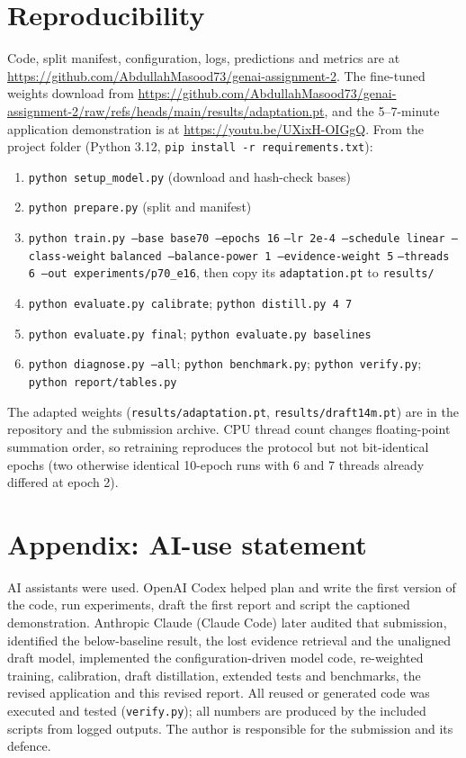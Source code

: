 \section*{Reproducibility}
Code, split manifest, configuration, logs, predictions and metrics are at \url{https://github.com/AbdullahMasood73/genai-assignment-2}. The fine-tuned weights download from \url{https://github.com/AbdullahMasood73/genai-assignment-2/raw/refs/heads/main/results/adaptation.pt}, and the 5--7-minute application demonstration is at \url{https://youtu.be/UXixH-OIGgQ}. From the project folder (Python 3.12, \texttt{pip install -r requirements.txt}):
{\footnotesize\begin{enumerate}\setlength{\itemsep}{0pt}
\item \texttt{python setup\_model.py} (download and hash-check bases)
\item \texttt{python prepare.py} (split and manifest)
\item \texttt{python train.py --base base70 --epochs 16} \texttt{--lr 2e-4 --schedule linear --class-weight} \texttt{balanced --balance-power 1 --evidence-weight 5} \texttt{--threads 6 --out experiments/p70\_e16}, then copy its \texttt{adaptation.pt} to \texttt{results/}
\item \texttt{python evaluate.py calibrate}; \texttt{python distill.py 4 7}
\item \texttt{python evaluate.py final}; \texttt{python evaluate.py baselines}
\item \texttt{python diagnose.py --all}; \texttt{python benchmark.py}; \texttt{python verify.py}; \texttt{python report/tables.py}
\end{enumerate}}
The adapted weights (\texttt{results/adaptation.pt}, \texttt{results/draft14m.pt}) are in the repository and the submission archive. CPU thread count changes floating-point summation order, so retraining reproduces the protocol but not bit-identical epochs (two otherwise identical 10-epoch runs with 6 and 7 threads already differed at epoch 2).

\section*{Appendix: AI-use statement}
AI assistants were used. OpenAI Codex helped plan and write the first version of the code, run experiments, draft the first report and script the captioned demonstration. Anthropic Claude (Claude Code) later audited that submission, identified the below-baseline result, the lost evidence retrieval and the unaligned draft model, implemented the configuration-driven model code, re-weighted training, calibration, draft distillation, extended tests and benchmarks, the revised application and this revised report. All reused or generated code was executed and tested (\texttt{verify.py}); all numbers are produced by the included scripts from logged outputs. The author is responsible for the submission and its defence.

